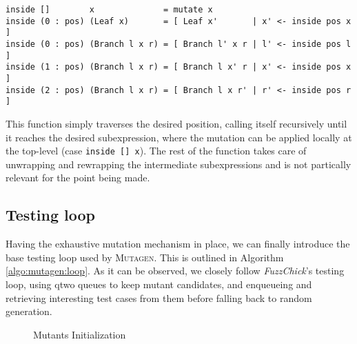 \documentclass[acmsmall, anonymous]{acmart}
\newcommand{\fuzzchick}{\textit{FuzzChick}\xspace}
\newcommand{\mutagen}{\textsc{Mutagen}\xspace}
\begin{document}
\begin{verbatim}
inside []        x              = mutate x
inside (0 : pos) (Leaf x)       = [ Leaf x'       | x' <- inside pos x ]
inside (0 : pos) (Branch l x r) = [ Branch l' x r | l' <- inside pos l ]
inside (1 : pos) (Branch l x r) = [ Branch l x' r | x' <- inside pos x ]
inside (2 : pos) (Branch l x r) = [ Branch l x r' | r' <- inside pos r ]
\end{verbatim}

\noindent This function simply traverses the desired position, calling itself
recursively until it reaches the desired subexpression, where the mutation can
be applied locally at the top-level (case \texttt{inside [] x}).
%
The rest of the function takes care of unwrapping and rewrapping the
intermediate subexpressions and is not partically relevant for the point being
made.


\subsection{Testing loop}

Having the exhaustive mutation mechanism in place, we can finally introduce the
base testing loop used by \mutagen.
%
This is outlined in Algorithm \ref{algo:mutagen:loop}.
%
As it can be observed, we closely follow \fuzzchick's testing loop, using qtwo
queues to keep mutant candidates, and enqueueing and retrieving interesting test
cases from them before falling back to random generation.

\begin{wrapfigure}{r}{0.5\textwidth}
\vspace{-10pt}
\begin{algorithm}[H]
  \SetInd{0em}{0.75em}
  \SetAlgoLined
  \DontPrintSemicolon
\caption{\label{algo:mutagen:init}Mutants Initialization}
\end{algorithm}
\vspace{-10pt}
\end{wrapfigure}
\end{document}
